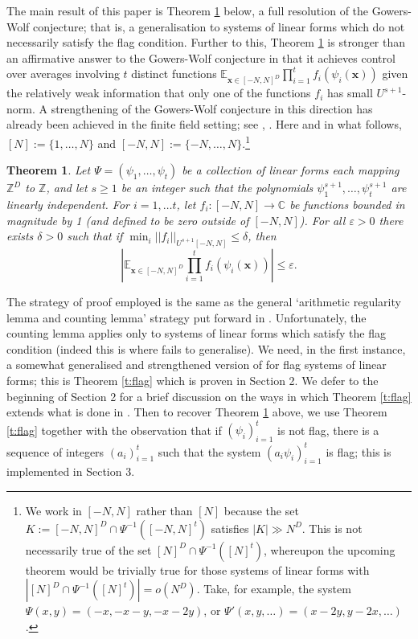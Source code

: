 \documentclass[10pt]{article}
\def\eps{\varepsilon}
\def\Z{\mathbb{Z}}
\def\C{\mathbb{C}}
\def\E{\mathbb{E}}
\newcommand{\vect}[1]{\boldsymbol{#1}}
\newtheorem{thm}[firstthm]{Theorem}
\begin{document}
The main result of this paper is Theorem \ref{t:main} below, a full resolution of the Gowers-Wolf conjecture; that is, a generalisation \cite[Theorem 1.13]{GT10} to systems of linear forms which do not necessarily satisfy the flag condition. Further to this, Theorem \ref{t:main} is stronger than an affirmative answer to the Gowers-Wolf conjecture in that it achieves control over averages involving $t$ distinct functions $\E_{\vect x \in [-N,N]^D} \prod_{i=1}^t f_i(\psi_i(\vect x))$  given the relatively weak information that only one of the functions $f_i$ has small $U^{s+1}$-norm.  A strengthening of the Gowers-Wolf conjecture in this direction has already been achieved in the finite field setting; see \cite{HL11}, \cite{HHL16}. Here and in what follows, $[N]:= \{1,\ldots,N\}$ and $[-N,N]:= \{ -N, \ldots, N\}$.\footnote{We work in $[-N,N]$ rather than $[N]$ because the set $K:=[-N,N]^D \cap \Psi^{-1}([-N,N]^t)$ satisfies $|K| \gg N^D$. This is not necessarily true of the set $[N]^D \cap \Psi^{-1}([N]^t)$, whereupon the upcoming theorem would be trivially true for those systems of linear forms with $|[N]^D \cap \Psi^{-1}([N]^t)| = o(N^D)$. Take, for example, the system $\Psi(x,y) = (-x,-x-y,-x-2y)$, or $\Psi'(x,y,\ldots) = (x-2y,y-2x,\ldots)$.}  

\begin{thm}\label{t:main}
Let $\Psi = (\psi_1, \ldots, \psi_t)$ be a collection of linear forms each mapping $\Z^D$ to $\Z$, and let $s \geq 1$ be an integer such that the polynomials $\psi_1^{s+1},\ldots,\psi_t^{s+1}$ are linearly independent. For $i=1, \ldots t$,  let $f_i:[-N,N] \to \C$ be functions bounded in magnitude by 1 (and defined to be zero outside of $[-N,N]$). For all $\eps >0$ there exists $\delta>0$ such that if $\min_{i} ||f_i||_{U^{s+1}[-N,N]} \leq \delta$, then 
\[\left|\E_{\vect x \in [-N,N]^D} \prod_{i=1}^t f_i(\psi_i(\vect x))\right| \leq \eps.\] 
\end{thm}

The strategy of proof employed is the same as the general `arithmetic regularity lemma and counting lemma' strategy put forward in \cite{GT10}. Unfortunately, the counting lemma \cite[Theorem 1.11]{GT10} applies only to systems of linear forms which satisfy the flag condition (indeed this is where \cite[Theorem 1.13]{GT20} fails to generalise). We need, in the first instance, a somewhat generalised and strengthened version of \cite[Theorem 1.13]{GT20} for flag systems of linear forms; this is Theorem \ref{t:flag} which is proven in Section 2. We defer to the beginning of Section 2 for a brief discussion on the ways in which Theorem \ref{t:flag} extends what is done in \cite[Theorem 1.13]{GT20}.  Then to recover Theorem \ref{t:main} above, we use Theorem \ref{t:flag} together with the observation that if $(\psi_i)_{i=1}^t$ is not flag, there is a sequence of integers $(a_i)_{i=1}^t$ such that the system $(a_i\psi_i)_{i=1}^t$ is flag; this is implemented in Section 3. 
\end{document}
